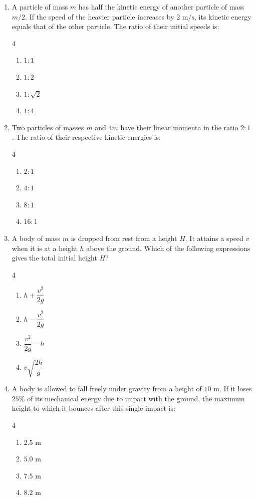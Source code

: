 \documentclass[11pt,a4paper]{article}
\begin{document}
\begin{enumerate}[label=\textbf{\arabic*.},leftmargin=18pt,itemsep=8pt]
  \item A particle of mass $m$ has half the kinetic energy of another particle of mass $m/2$. If the speed of the heavier particle increases by $2\text{ m/s}$, its kinetic energy equals that of the other particle. The ratio of their initial speeds is:
  \begin{multicols}{4}
    \begin{enumerate}[label=(\Alph*)]
      \item $1 : 1$
      \item $1 : 2$
      \item $1 : \sqrt{2}$
      \item $1 : 4$
    \end{enumerate}
  \end{multicols}

  \item Two particles of masses $m$ and $4m$ have their linear momenta in the ratio $2 : 1$. The ratio of their respective kinetic energies is:
  \begin{multicols}{4}
    \begin{enumerate}[label=(\Alph*)]
      \item $2 : 1$
      \item $4 : 1$
      \item $8 : 1$
      \item $16 : 1$
    \end{enumerate}
  \end{multicols}

  \item A body of mass $m$ is dropped from rest from a height $H$. It attains a speed $v$ when it is at a height $h$ above the ground. Which of the following expressions gives the total initial height $H$?
  \begin{multicols}{4}
    \begin{enumerate}[label=(\Alph*)]
      \item $h + \dfrac{v^2}{2g}$
      \item $h - \dfrac{v^2}{2g}$
      \item $\dfrac{v^2}{2g} - h$
      \item $v\sqrt{\dfrac{2h}{g}}$
    \end{enumerate}
  \end{multicols}

  \item A body is allowed to fall freely under gravity from a height of $10\text{ m}$. If it loses $25\%$ of its mechanical energy due to impact with the ground, the maximum height to which it bounces after this single impact is:
  \begin{multicols}{4}
    \begin{enumerate}[label=(\Alph*)]
      \item $2.5\text{ m}$
      \item $5.0\text{ m}$
      \item $7.5\text{ m}$
      \item $8.2\text{ m}$
    \end{enumerate}
  \end{multicols}


\end{enumerate}
\end{document}
